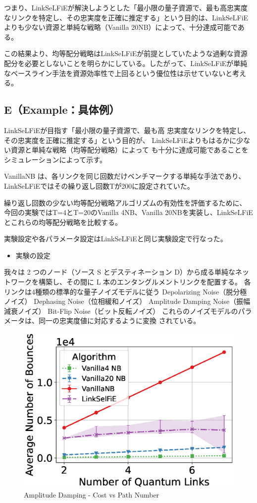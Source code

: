 \documentclass[conference]{IEEEtran}
\begin{document}
つまり、LinkSeLFiEが解決しようとした「最小限の量子資源で、最も高忠実度
なリンクを特定し、その忠実度を正確に推定する」という目的は、LinkSeLFiE
よりも少ない資源と単純な戦略（Vanilla 20NB）によって、十分達成可能である。

この結果より、均等配分戦略はLinkSeLFiEが前提としていたような過剰な資源
配分を必要としないことを明らかにしている。したがって、LinkSeLFiEが単純
なベースライン手法を資源効率性で上回るという優位性は示せていないと考え
る。
\subsection{E（Example：具体例）}
\label{sec:orgc588b0e}
LinkSeLFiEが目指す「最小限の量子資源で、最も高
忠実度なリンクを特定し、その忠実度を正確に推定する」という目的が、
LinkSeLFiEよりもはるかに少ない資源と単純な戦略（均等配分戦略）によって
も十分に達成可能であることをシミュレーションによって示す。

VanillaNB は、各リンクを同じ回数だけベンチマークする単純な手法であり、
LinkSeLFiEではその繰り返し回数Tが200に設定されていた。

繰り返し回数の少ない均等配分戦略アルゴリズムの有効性を評価するために、
今回の実験ではT=4とT=20のVanilla 4NB、Vanilla 20NBを実装し、LinkSeLFiE
とこれらの均等配分戦略を比較する。

実験設定や各パラメータ設定はLinkSeLFiEと同じ実験設定で行なった。

\begin{itemize}
\item 実験の設定
\end{itemize}
我々は 2 つのノード（ソース S とデスティネーション D）から成る単純なネッ
トワークを構築し、その間に L 本のエンタングルメントリンクを配置する。
各リンクは4種類の標準的な量子ノイズモデルに従う
Depolarizing Noise（脱分極ノイズ）
Dephasing Noise（位相緩和ノイズ）
Amplitude Damping Noise（振幅減衰ノイズ）
Bit-Flip Noise（ビット反転ノイズ）
これらのノイズモデルのパラメータは、同一の忠実度値に対応するように変換
されている。






\begin{figure}[t]
\centering
\includegraphics[width=0.45\columnwidth]{figure/plot_cost_vs_path_num_AmplitudeDamping.eps}
\caption{Amplitude Damping - Cost vs Path Number}
\label{fig:cost_amplitude}
\end{figure}
\end{document}
